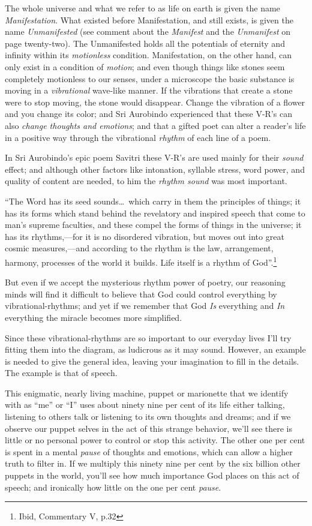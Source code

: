 \documentclass[12pt,a4paper]{book}
\begin{document}
The whole universe and what we refer to as life on earth is given the
name \emph{Manifestation}.  What existed before Manifestation, and
still exists, is given the name \emph{Unmanifested} (see comment about
the \emph{Manifest} and the \emph{Unmanifest} on page
twenty-two).  The Unmanifested holds all the potentials of
eternity and infinity within its \emph{motionless} condition.
Manifestation, on the other hand, can only exist in a condition of
\emph{motion}; and even though things like stones seem completely
motionless to our senses, under a microscope the basic substance is
moving in a \emph{vibrational} wave-like manner.  If the vibrations
that create a stone were to stop moving, the stone would disappear.
Change the vibration of a flower and you change its color; and Sri
Aurobindo experienced that these V-R's can also \emph{change thoughts
  and emotions}; and that a gifted poet can alter a reader's life in a
positive way through the vibrational \emph{rhythm} of each line of a
poem.

In Sri Aurobindo's epic poem Savitri these V-R's are used mainly for
their \emph{sound} effect; and although other factors like intonation,
syllable stress, word power, and quality of content are needed, to him
the \emph{rhythm sound} was most important.

``The Word has its seed sounds\ldots\ which carry in them the
principles of things; it has its forms which stand behind the
revelatory and inspired speech that come to man's supreme faculties,
and these compel the forms of things in the universe; it has its
rhythms,---for it is no disordered vibration, but moves out into great
cosmic measures,---and according to the rhythm is the law,
arrangement, harmony, processes of the world it builds. Life itself is
a rhythm of God''.\footnote{Ibid, Commentary V, p.32}


But even if we accept the mysterious rhythm power of poetry, our
reasoning minds will find it difficult to believe that God could
control everything by vibrational-rhythms; and yet if we remember that
God \emph{Is} everything and \emph{In} everything the miracle becomes
more simplified.

Since these vibrational-rhythms are so important to our everyday lives
I'll try fitting them into the diagram, as ludicrous as it may
sound. However, an example is needed to give the general idea, leaving
your imagination to fill in the details. The example is that of
speech.

This enigmatic, nearly living machine, puppet or marionette that we
identify with as ``me'' or ``I'' uses about ninety nine per cent of
its life either talking, listening to others talk or listening to its
own thoughts and dreams; and if we observe our puppet selves in the
act of this strange behavior, we'll see there is little or no personal
power to control or stop this activity. The other one per cent is
spent in a mental \emph{pause} of thoughts and emotions, which can
allow a higher truth to filter in. If we multiply this ninety nine per
cent by the six billion other puppets in the world, you'll see how
much importance God places on this act of speech; and ironically how
little on the one per cent \emph{pause}.
\end{document}
